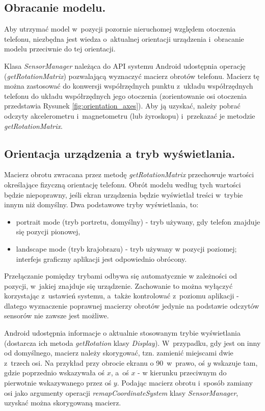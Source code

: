 \documentclass[a4paper,twocolumn,11pt]{article}
\begin{document}
\subsection{Obracanie modelu.}
 Aby utrzymać model w~pozycji pozornie nieruchomej względem otoczenia telefonu, niezbędna jest wiedza o~aktualnej orientacji urządzenia i~obracanie modelu przeciwnie do tej orientacji.
 
 Klasa \emph{SensorManager} należąca do API systemu Android udostępnia operację (\emph{getRotationMatrix}) pozwalającą wyznaczyć macierz obrotów telefonu.
 Macierz tę można zastosować do konwersji współrzędnych punktu z~układu współrzędnych telefonu do układu współrzędnych jego otoczenia (zorientowanie osi otoczenia przedstawia Rysunek \ref{fig:orientation_axes}).
 Aby ją uzyskać, należy pobrać odczyty akcelerometru i~magnetometru (lub żyroskopu) i~przekazać je metodzie \emph{getRotationMatrix}.

 


\subsection{Orientacja urządzenia a tryb wyświetlania.}
 Macierz obrotu zwracana przez metodę \emph{getRotationMatrix} przechowuje wartości określające fizyczną orientację telefonu.
 Obrót modelu według tych wartości będzie niepoprawny, jeśli ekran urządzenia będzie wyświetlał treści w~trybie innym niż domyślny.
 Dwa podstawowe tryby wyświetlania, to:
 \begin{itemize}
  \item portrait mode (tryb portretu, domyślny) - tryb używany, gdy telefon znajduje się pozycji pionowej,
  \item landscape mode (tryb krajobrazu) - tryb używany w pozycji poziomej; interfejs graficzny aplikacji jest odpowiednio obrócony.
 \end{itemize}
 
 Przełączanie pomiędzy trybami odbywa się automatycznie w zależności od pozycji, w~jakiej znajduje się urządzenie.
 Zachowanie to można wyłączyć korzystając z~ustawień systemu, a~także kontrolować z~poziomu aplikacji - dlatego wyznaczenie poprawnej macierzy obrotów jedynie na podstawie odczytów sensorów nie zawsze jest możliwe.
 
 Android udostępnia informacje o aktualnie stosowanym trybie wyświetlania (dostarcza ich metoda \emph{getRotation} klasy \emph{Display}).
 W~przypadku, gdy jest on inny od domyślnego, macierz należy skorygować, tzn. zamienić miejscami dwie z~trzech osi.
 Na przykład przy obrocie ekranu o 90\textdegree~w~prawo, oś $y$ wskazuje tam, gdzie poprzednio wskazywała oś $x$, a~oś $x$ - w kierunku przeciwnym do pierwotnie wskazywanego przez oś $y$.
 Podając macierz obrotu i~sposób zamiany osi jako argumenty operacji \emph{remapCoordinateSystem} klasy \emph{SensorManager}, uzyskać można skorygowaną macierz.
\end{document}

